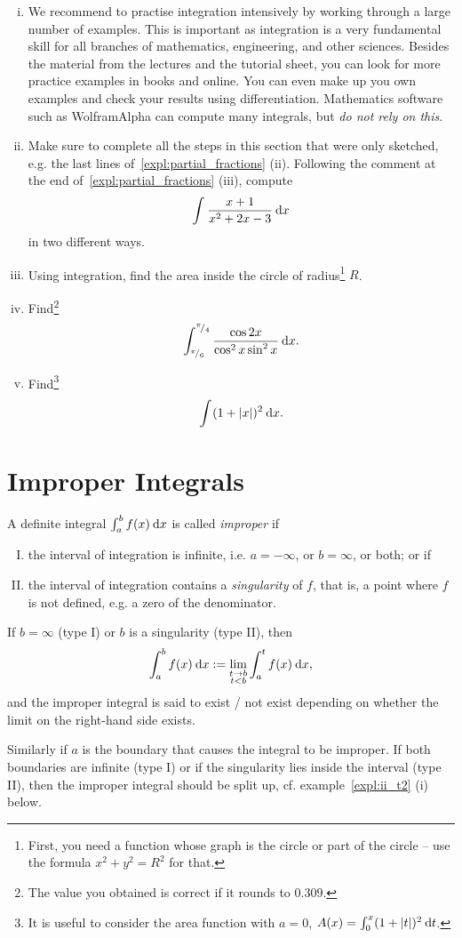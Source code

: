 \begin{exercise}
\begin{enumerate}[(i)]
	\item We recommend to practise integration intensively by working through a large number of examples. This is important as integration is a very fundamental skill for all branches of mathematics, engineering, and other sciences. Besides the material from the lectures and the tutorial sheet, you can look for more practice examples in books and online. You can even make up you own examples and check your results using differentiation. Mathematics software such as WolframAlpha can compute many integrals, but \emph{do not rely on this}. 
	\item Make sure to complete all the steps in this section that were only sketched, e.g. the last lines of~\ref{expl:partial_fractions} (ii). Following the comment at the end of~\ref{expl:partial_fractions} (iii), compute
	\[ \int_{}^{} \frac{x+1}{x^2+2x-3} \: \mathrm{d} x \]
	in two different ways.
	\item Using integration, find the area inside the circle of radius\footnote{First, you need a function whose graph is the circle or part of the circle -- use the formula $x^2+y^2=R^2$ for that.} $R$.
	\item Find\footnote{The value you obtained is correct if it rounds to $0.309$.}
	\[ \int_{{}^{\pi}\!/_{6}}^{{}^{\pi}\!/_{4}} \frac{\cos 2x}{\cos^2 x \sin^2 x} \: \mathrm{d} x. \]
	\item Find\footnote{It is useful to consider the area function with $a=0$, $A(x)=\int_{0}^{x} (1+\left| t \right|)^2 \: \mathrm{d} t$.}
	\[ \int_{}^{} (1+\left| x \right|)^2 \: \mathrm{d} x. \]
	
\end{enumerate}		
\end{exercise}


\section{Improper Integrals}

\begin{definition}
A definite integral $\int_{a}^{b} f(x) \: \mathrm{d} x$ is called \emph{improper} if
\begin{enumerate}[(I)]
	\item the interval of integration is infinite, i.e. $a=-\infty$, or $b=\infty$, or both;
			 or if 
	\item the interval of integration contains a \emph{singularity} of $f$, that is, a point where $f$ is not defined, e.g. a zero of the denominator.
\end{enumerate}
If $b=\infty$ (type I) or $b$ is a singularity (type II), then
\[ \int_{a}^{b} f(x) \: \mathrm{d} x := \lim_{\substack{t \to b \\ t<b}} \int_{a}^{t} f(x) \: \mathrm{d} x, \]
and the improper integral is said to exist / not exist depending on whether the limit on the right-hand side exists.

Similarly if $a$ is the boundary that causes the integral to be improper. If both boundaries are infinite (type I) or if the singularity lies inside the interval (type II), then the improper integral should be split up, cf. example~\ref{expl:ii_t2} (i) below.
\end{definition}

